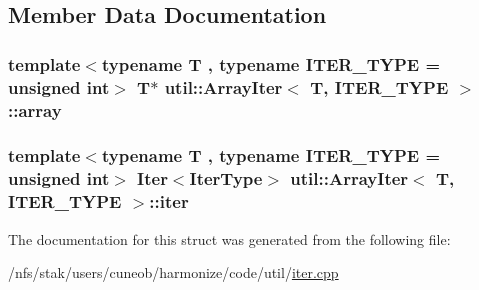 \subsection{Member Data Documentation}
\hypertarget{structutil_1_1ArrayIter_a4915fb20478162c0dc345d3c9dae2869}{
\subsubsection[{array}]{\setlength{\rightskip}{0pt plus 5cm}template$<$typename T , typename I\-T\-E\-R\-\_\-\-T\-Y\-P\-E  = unsigned int$>$ T$\ast$ {\bf util\-::\-Array\-Iter}$<$ T, I\-T\-E\-R\-\_\-\-T\-Y\-P\-E $>$\-::array}}\label{structutil_1_1ArrayIter_a4915fb20478162c0dc345d3c9dae2869}
\hypertarget{structutil_1_1ArrayIter_aa1bbd6172481bcc23bf48f860a68e40d}{
\subsubsection[{iter}]{\setlength{\rightskip}{0pt plus 5cm}template$<$typename T , typename I\-T\-E\-R\-\_\-\-T\-Y\-P\-E  = unsigned int$>$ {\bf Iter}$<${\bf Iter\-Type}$>$ {\bf util\-::\-Array\-Iter}$<$ T, I\-T\-E\-R\-\_\-\-T\-Y\-P\-E $>$\-::iter}}\label{structutil_1_1ArrayIter_aa1bbd6172481bcc23bf48f860a68e40d}


The documentation for this struct was generated from the following file\-:\begin{DoxyCompactItemize}
\item 
/nfs/stak/users/cuneob/harmonize/code/util/\hyperlink{iter_8cpp}{iter.\-cpp}\end{DoxyCompactItemize}
